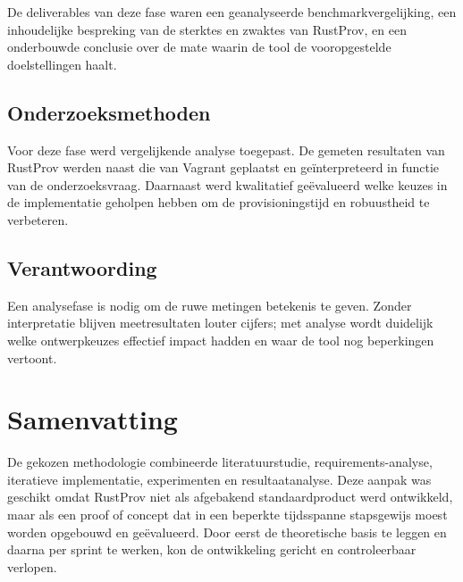 De deliverables van deze fase waren een geanalyseerde benchmarkvergelijking, een inhoudelijke bespreking van de sterktes en zwaktes van RustProv, en een onderbouwde conclusie over de mate waarin de tool de vooropgestelde doelstellingen haalt. 

\subsection{Onderzoeksmethoden}

Voor deze fase werd vergelijkende analyse toegepast. De gemeten resultaten van RustProv werden naast die van Vagrant geplaatst en geïnterpreteerd in functie van de onderzoeksvraag. Daarnaast werd kwalitatief geëvalueerd welke keuzes in de implementatie geholpen hebben om de provisioningstijd en robuustheid te verbeteren.

\subsection{Verantwoording}

Een analysefase is nodig om de ruwe metingen betekenis te geven. Zonder interpretatie blijven meetresultaten louter cijfers; met analyse wordt duidelijk welke ontwerpkeuzes effectief impact hadden en waar de tool nog beperkingen vertoont. 

\section{Samenvatting}

De gekozen methodologie combineerde literatuurstudie, requirements-analyse, iteratieve implementatie, experimenten en resultaatanalyse. Deze aanpak was geschikt omdat RustProv niet als afgebakend standaardproduct werd ontwikkeld, maar als een proof of concept dat in een beperkte tijdsspanne stapsgewijs moest worden opgebouwd en geëvalueerd. Door eerst de theoretische basis te leggen en daarna per sprint te werken, kon de ontwikkeling gericht en controleerbaar verlopen. 



